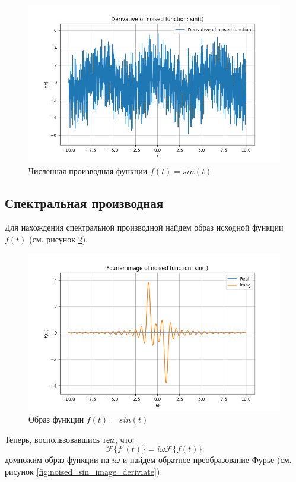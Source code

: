 \begin{figure}[ht!]
    \centering
    \includegraphics[width=\textwidth]{../results/10/noised_sin_derivative.png}
    \caption{Численная производная функции $f(t) = sin(t)$}
    \label{fig:diff_noised_sin}
\end{figure}

\FloatBarrier
\subsection{Спектральная производная}
Для нахождения спектральной производной найдем образ исходной функции $f(t)$ (см. рисунок \ref{fig:noised_sin_image}). 
\begin{figure}[ht!]
    \centering
    \includegraphics[width=\textwidth]{../results/10/noised_sin_image.png}
    \caption{Образ функции $f(t) = sin(t)$}
    \label{fig:noised_sin_image}
\end{figure}
Теперь, воспользовавшись тем, что:
\begin{equation}
    \mathcal{F}\{f'(t)\} = i \omega \mathcal{F}\{f(t)\}
\end{equation}
домножим образ функции на $i \omega$ и найдем обратное преобразование Фурье (см. рисунок \ref{fig:noised_sin_image_deriviate}).

